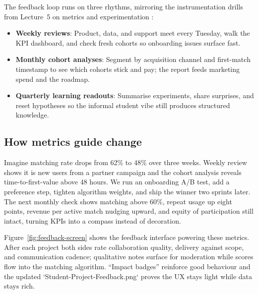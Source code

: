The feedback loop runs on three rhythms, mirroring the instrumentation drills from Lecture~5 on metrics and experimentation \citep{Lecture05}:
\begin{itemize}
    \item \textbf{Weekly reviews}: Product, data, and support meet every Tuesday, walk the KPI dashboard, and check fresh cohorts so onboarding issues surface fast.
    \item \textbf{Monthly cohort analyses}: Segment by acquisition channel and first-match timestamp to see which cohorts stick and pay; the report feeds marketing spend and the roadmap.
    \item \textbf{Quarterly learning readouts}: Summarise experiments, share surprises, and reset hypotheses so the informal student vibe still produces structured knowledge.
\end{itemize}

\subsection*{How metrics guide change}
Imagine matching rate drops from 62\% to 48\% over three weeks. Weekly review shows it is new users from a partner campaign and the cohort analysis reveals time-to-first-value above 48 hours. We run an onboarding A/B test, add a preference step, tighten algorithm weights, and ship the winner two sprints later. The next monthly check shows matching above 60\%, repeat usage up eight points, revenue per active match nudging upward, and equity of participation still intact, turning KPIs into a compass instead of decoration.

Figure~\ref{fig:feedback-screen} shows the feedback interface powering these metrics. After each project both sides rate collaboration quality, delivery against scope, and communication cadence; qualitative notes surface for moderation while scores flow into the matching algorithm. ``Impact badges'' reinforce good behaviour and the updated `Student-Project-Feedback.png` proves the UX stays light while data stays rich.

